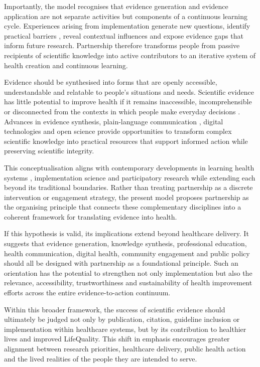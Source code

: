 \documentclass{article}
\begin{document}
Importantly, the model recognises that evidence generation and evidence application are not separate activities \cite{IOM2013} but components of a continuous learning cycle. Experiences arising from implementation generate new questions, identify practical barriers \cite{Nilsen2015}, reveal contextual influences and expose evidence gaps \cite{Morris2011} that inform future research. Partnership therefore transforms people from passive recipients of scientific knowledge into active contributors to an iterative system of health creation and continuous learning.

Evidence should be synthesised into forms that are openly accessible, understandable and relatable to people's situations and needs. Scientific evidence has little potential to improve health if it remains inaccessible, incomprehensible or disconnected from the contexts in which people make everyday decisions \cite{Nutbeam2000} \cite{Greenhalgh2011}. Advances in evidence synthesis, plain-language communication \cite{Straus2013}, digital technologies and open science provide opportunities to transform complex scientific knowledge into practical resources that support informed action while preserving scientific integrity.

This conceptualisation aligns with contemporary developments in learning health systems \cite{IOM2013}, implementation science \cite{Eccles2006} \cite{Nilsen2015} and participatory research \cite{Cargo2008}  while extending each beyond its traditional boundaries. Rather than treating partnership as a discrete intervention or engagement strategy, the present model proposes partnership as the organising principle that connects these complementary disciplines into a coherent framework for translating evidence into health.

If this hypothesis is valid, its implications extend beyond healthcare delivery. It suggests that evidence generation, knowledge synthesis, professional education, health communication, digital health, community engagement and public policy should all be designed with partnership as a foundational principle. Such an orientation has the potential to strengthen not only implementation but also the relevance, accessibility, trustworthiness and sustainability of health improvement efforts across the entire evidence-to-action continuum.

Within this broader framework, the success of scientific evidence should ultimately be judged not only by publication, citation, guideline inclusion or implementation within healthcare systems, but by its contribution to healthier lives and improved LifeQuality. This shift in emphasis encourages greater alignment between research priorities, healthcare delivery, public health action and the lived realities of the people they are intended to serve.
\end{document}
